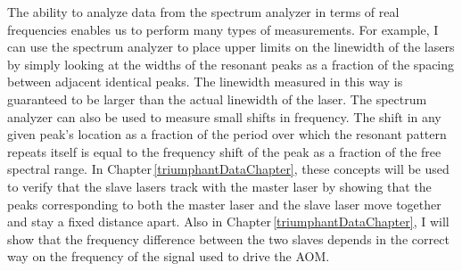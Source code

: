 The ability to analyze data from the spectrum analyzer in terms of real frequencies enables us to perform many types of measurements.
For example, I can use the spectrum analyzer to place upper limits on the linewidth of the lasers by simply looking at the widths of the resonant peaks as a fraction of the spacing between adjacent identical peaks. The linewidth measured in this way is guaranteed to be larger than the actual linewidth of the laser.
The spectrum analyzer can also be used to measure small shifts in frequency. The shift in any given peak's location as a fraction of the period over which the resonant pattern repeats itself is equal to the frequency shift of the peak as a fraction of the free spectral range. In Chapter\,\ref{triumphantDataChapter}, these concepts will be used to verify that the slave lasers track with the master laser by showing that the peaks corresponding to both the master laser and the slave laser move together and stay a fixed distance apart. Also in Chapter\,\ref{triumphantDataChapter}, I will show that the frequency difference between the two slaves depends in the correct way on the frequency of the signal used to drive the AOM. 






